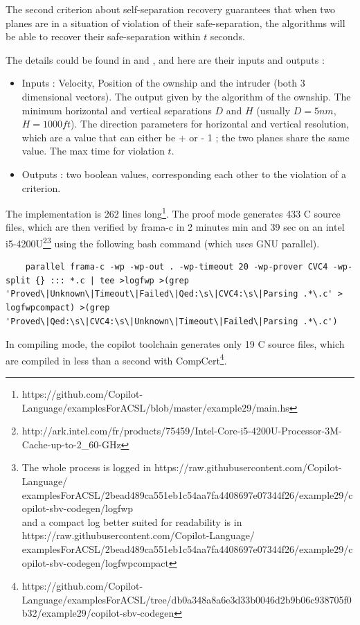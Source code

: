 \documentclass[a4paper,11pt,final]{article}
\begin{document}
	The second criterion about self-separation recovery guarantees that when two planes are in a situation of violation of their safe-separation, the algorithms will be able to recover their safe-separation within $t$ seconds.
	
	The details could be found in \cite{MBNMH2010NASA} and \cite{NM2011NASA}, and here are their inputs and outputs :
	\begin{itemize}
		\item Inputs : Velocity, Position of the ownship and the intruder (both 3 dimensional vectors). The output given by the algorithm of the ownship. The minimum horizontal and vertical separations $D$ and $H$ (usually $D = 5nm$, $H=1000ft$). The direction parameters for horizontal and vertical resolution, which are a value that can either be + or - 1 ; the two planes share the same value. The max time for violation $t$.
		\item Outputs : two boolean values, corresponding each other to the violation of a criterion.
	\end{itemize}
	
	The implementation is 262 lines long\footnote{https://github.com/Copilot-Language/examplesForACSL/blob/master/example29/main.hs}. The proof mode generates 433 C source files, which are then verified by frama-c in 2 minutes min and 39 sec on an intel i5-4200U\footnote{http://ark.intel.com/fr/products/75459/Intel-Core-i5-4200U-Processor-3M-Cache-up-to-2\_60-GHz}\footnote{The whole process is logged in  https://raw.githubusercontent.com/Copilot-Language/\\examplesForACSL/2bead489ca551eb1c54aa7fa4408697e07344f26/example29/copilot-sbv-codegen/logfwp \\ and a compact log better suited for readability is in  https://raw.githubusercontent.com/Copilot-Language/\\examplesForACSL/2bead489ca551eb1c54aa7fa4408697e07344f26/example29/copilot-sbv-codegen/logfwpcompact} using the following bash command (which uses GNU parallel).
	\begin{lstlisting}
	parallel frama-c -wp -wp-out . -wp-timeout 20 -wp-prover CVC4 -wp-split {} ::: *.c | tee >logfwp >(grep 'Proved\|Unknown\|Timeout\|Failed\|Qed:\s\|CVC4:\s\|Parsing .*\.c' > logfwpcompact) >(grep 'Proved\|Qed:\s\|CVC4:\s\|Unknown\|Timeout\|Failed\|Parsing .*\.c')
	\end{lstlisting}
	
	In compiling mode, the copilot toolchain generates only 19 C source files, which are compiled in less than a second with CompCert\footnote{https://github.com/Copilot-Language/examplesForACSL/tree/db0a348a8a6e3d33b0046d2b9b06c938705f0b32/example29/copilot-sbv-codegen}.
	
\end{document}
